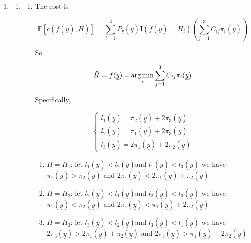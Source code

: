 \documentclass[a4paper]{article}
\begin{document}
\begin{enumerate}
\item \begin{enumerate} %
  \item \begin{enumerate}
    \item The cost is 
  
    \begin{equation}
      \mathbb{E}[c(f(\underline{y}),H)] = \sum_{i=1}^3 P_{\underline{\mathrm{y}}}(\underline{y}) \mathbf{I}(f(\underline{y}) = H_i) \left( \sum_{j=1}^3 C_{ij}\pi_i(\underline{y}) \right)
    \end{equation}
  
    So
  
    \begin{equation}
      \hat H = f(\underline{y}) = \operatorname*{arg\,min}_{i} \sum_{j=1}^3 C_{ij}\pi_i(\underline{y})
    \end{equation}
  
    Specifically,
  
    \begin{equation}
      \left\{
        \begin{aligned}
          l_1(\underline{y}) = \pi_{2}(\underline{y}) + 2 \pi_3({\underline{y}}) \\
          l_2(\underline{y}) = \pi_{1}(\underline{y}) + 2 \pi_3({\underline{y}}) \\
          l_3 (\underline{y})= 2\pi_{1}(\underline{y}) + 2 \pi_2({\underline{y}})
        \end{aligned}
      \right.
    \end{equation}
  
    \begin{enumerate}
      \item $ \hat H = H_1$: let $ l_1(\underline{y}) < l_2(\underline{y})$and  $ l_1(\underline{y}) <l_3 (\underline{y})$ we have $\pi_1(\underline{y}) > \pi_2(\underline{y})$ and $2\pi_3(\underline{y})<2\pi_1(\underline{y}) + \pi_2(\underline{y})$
      \item $ \hat H = H_2$: let $ l_2(\underline{y}) < l_1(\underline{y})$and  $ l_2(\underline{y}) <l_3 (\underline{y})$ we have $\pi_1(\underline{y}) < \pi_2(\underline{y})$ and $2\pi_3(\underline{y})<\pi_1(\underline{y}) + 2\pi_2(\underline{y})$
      \item $ \hat H = H_3$: let $ l_3(\underline{y}) < l_2(\underline{y})$and  $ l_3(\underline{y}) <l_1 (\underline{y})$ we have $2\pi_3(\underline{y})> 2\pi_1(\underline{y}) + \pi_2(\underline{y})$ and  $2\pi_3(\underline{y})> \pi_1(\underline{y}) + 2\pi_2(\underline{y})$
    \end{enumerate}
  

\end{enumerate}
\end{enumerate}
\end{enumerate}
\end{document}
